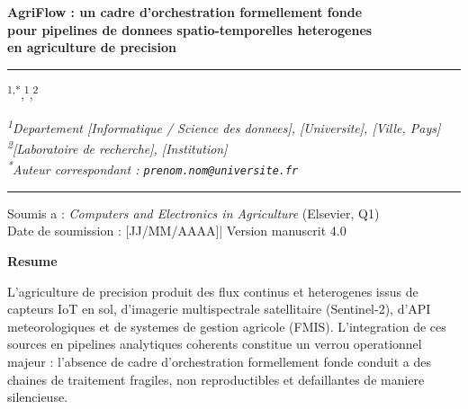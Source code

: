 \documentclass[12pt,a4paper]{article}
\theoremstyle{plain}
\theoremstyle{definition}
\theoremstyle{remark}
\begin{document}

\begin{titlepage}
\begin{center}
\vspace*{1cm}

{\LARGE\sffamily\bfseries\color{darkblue}
  AgriFlow : un cadre d'orchestration formellement fonde\\[6pt]
  pour pipelines de donnees spatio-temporelles heterogenes\\[6pt]
  en agriculture de precision}

\vspace{0.8cm}
{\color{darkblue}\rule{13cm}{1.2pt}}
\vspace{0.45cm}

{\large{}\textsuperscript{1,*},\;
  [Co-auteur A]\textsuperscript{1},\;
  [Co-auteur B]\textsuperscript{2}}

\vspace{0.4cm}
{\normalsize\itshape
  \textsuperscript{1}Departement [Informatique / Science des donnees],
  [Universite], [Ville, Pays]\\[3pt]
  \textsuperscript{2}[Laboratoire de recherche], [Institution]\\[6pt]
  \textsuperscript{*}Auteur correspondant :
  \texttt{prenom.nom@universite.fr}}

\vspace{0.65cm}
{\color{darkblue}\rule{13cm}{0.5pt}}
\vspace{0.4cm}

{\small\sffamily
  Soumis a :
  \textit{Computers and Electronics in Agriculture} (Elsevier, Q1)\\
  Date de soumission : [JJ/MM/AAAA]\quad|\quad
  Version manuscrit 4.0}
\end{center}

\vspace{0.7cm}

\noindent\textbf{\large Resume}

\medskip\noindent
L'agriculture de precision produit des flux continus et heterogenes issus
de capteurs IoT en sol, d'imagerie multispectrale satellitaire (Sentinel-2),
d'API meteorologiques et de systemes de gestion agricole (FMIS).
L'integration de ces sources en pipelines analytiques coherents constitue
un verrou operationnel majeur : l'absence de cadre d'orchestration
formellement fonde conduit a des chaines de traitement fragiles,
non reproductibles et defaillantes de maniere silencieuse.


\end{titlepage}
\end{document}
